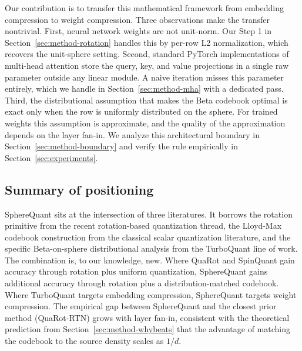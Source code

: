 Our contribution is to transfer this mathematical framework from
embedding compression to weight compression. Three observations make
the transfer nontrivial. First, neural network weights are not
unit-norm. Our Step 1 in Section~\ref{sec:method-rotation} handles this
by per-row L2 normalization, which recovers the unit-sphere setting.
Second, standard PyTorch implementations of multi-head attention store
the query, key, and value projections in a single raw parameter outside
any linear module. A naive iteration misses this parameter entirely,
which we handle in Section~\ref{sec:method-mha} with a dedicated pass.
Third, the distributional assumption that makes the Beta codebook
optimal is exact only when the row is uniformly distributed on the
sphere. For trained weights this assumption is approximate, and the
quality of the approximation depends on the layer fan-in. We analyze
this architectural boundary in Section~\ref{sec:method-boundary} and
verify the rule empirically in Section~\ref{sec:experiments}.

\subsection{Summary of positioning}

SphereQuant sits at the intersection of three literatures. It borrows the
rotation primitive from the recent rotation-based quantization thread,
the Lloyd-Max codebook construction from the classical scalar
quantization literature, and the specific Beta-on-sphere distributional
analysis from the TurboQuant line of work. The combination is, to our
knowledge, new. Where QuaRot and SpinQuant gain accuracy through
rotation plus uniform quantization, SphereQuant gains additional accuracy
through rotation plus a distribution-matched codebook. Where
TurboQuant targets embedding compression, SphereQuant targets weight
compression. The empirical gap between SphereQuant and the closest prior method
(QuaRot-RTN) grows with layer fan-in, consistent with the theoretical
prediction from Section~\ref{sec:method-whybeats} that the advantage of
matching the codebook to the source density scales as $1/d$.

